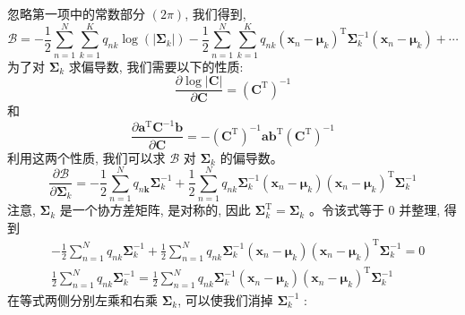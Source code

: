 \documentclass[UTF8]{ctexart}
\numberwithin{equation}{section}
\begin{document}
忽略第一项中的常数部分 $(2 \pi)$, 我们得到,
\begin{equation}
    \mathcal{B}=-\frac{1}{2} \sum_{n=1}^{N} \sum_{k=1}^{K} q_{n k} \log \left(\left|\boldsymbol{\Sigma}_{k}\right|\right)-\frac{1}{2} \sum_{n=1}^{N} \sum_{k=1}^{K} q_{n k}\left(\boldsymbol{x}_{n}-\boldsymbol{\mu}_{k}\right)^{\mathrm{T}} \boldsymbol{\Sigma}_{k}^{-1}\left(\boldsymbol{x}_{n}-\boldsymbol{\mu}_{k}\right)+\cdots 
\end{equation}
为了对 $\boldsymbol{\Sigma}_{k}$ 求偏导数, 我们需要以下的性质:
\begin{equation}
    \frac{\partial \log |\boldsymbol{C}|}{\partial \boldsymbol{C}}=\left(\boldsymbol{C}^{\mathrm{T}}\right)^{-1}  
\end{equation}
和
\begin{equation}
    \frac{\partial \boldsymbol{a}^{\mathrm{T}} \boldsymbol{C}^{-1} \boldsymbol{b}}{\partial \boldsymbol{C}}=-\left(\boldsymbol{C}^{\mathrm{T}}\right)^{-1} \boldsymbol{a} \boldsymbol{b}^{\mathrm{T}}\left(\boldsymbol{C}^{\mathrm{T}}\right)^{-1}    
\end{equation}
利用这两个性质, 我们可以求 $\mathcal{B}$ 对 $\boldsymbol{\Sigma}_{k}$ 的偏导数。
\begin{equation}
    \frac{\partial \mathcal{B}}{\partial \boldsymbol{\Sigma}_{k}}=-\frac{1}{2} \sum_{n=1}^{N} q_{n \boldsymbol{k}} \boldsymbol{\Sigma}_{k}^{-1}+\frac{1}{2} \sum_{n=1}^{N} q_{n k} \boldsymbol{\Sigma}_{k}^{-1}\left(\boldsymbol{x}_{n}-\boldsymbol{\mu}_{k}\right)\left(\boldsymbol{x}_{n}-\boldsymbol{\mu}_{k}\right)^{\mathrm{T}} \boldsymbol{\Sigma}_{k}^{-1}    
\end{equation}
注意, $\boldsymbol{\Sigma}_{k}$ 是一个协方差矩阵, 是对称的, 
因此 $\boldsymbol{\Sigma}_{k}^{\mathrm{T}}=\boldsymbol{\Sigma}_{k}$ 。令该式等于 0 并整理, 得到
$$
\begin{aligned}
&-\frac{1}{2} \sum_{n=1}^{N} q_{n k} \boldsymbol{\Sigma}_{k}^{-1}+\frac{1}{2} \sum_{n=1}^{N} q_{n k} \boldsymbol{\Sigma}_{k}^{-1}\left(\boldsymbol{x}_{n}-\boldsymbol{\mu}_{k}\right)\left(\boldsymbol{x}_{n}-\boldsymbol{\mu}_{k}\right)^{\mathrm{T}} \boldsymbol{\Sigma}_{k}^{-1}=0 \\
&\frac{1}{2} \sum_{n=1}^{N} q_{n k} \boldsymbol{\Sigma}_{k}^{-1}=\frac{1}{2} \sum_{n=1}^{N} q_{n k} \boldsymbol{\Sigma}_{k}^{-1}\left(\boldsymbol{x}_{n}-\boldsymbol{\mu}_{k}\right)\left(\boldsymbol{x}_{n}-\boldsymbol{\mu}_{k}\right)^{\mathrm{T}} \boldsymbol{\Sigma}_{k}^{-1}
\end{aligned}
$$
在等式两侧分别左乘和右乘 $\boldsymbol{\Sigma}_{k}$, 可以使我们消掉 $\boldsymbol{\Sigma}_{k}^{-1}$ :
\end{document}
